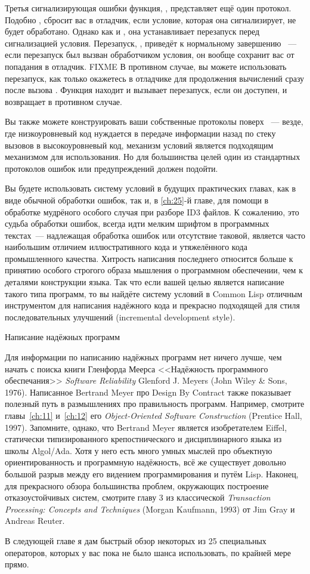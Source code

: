 Третья сигнализирующая ошибки функция, , представляет ещё один протокол.
Подобно ,  сбросит вас в отладчик, если условие, которая она
сигнализирует, не будет обработано. Однако как и , она устанавливает перезапуск
перед сигнализацией условия. Перезапуск, , приведёт к нормальному
завершению ~--- если перезапуск был вызван обработчиком условия, он вообще
сохранит вас от попадания в отладчик. FIXME В противном случае, вы можете использовать
перезапуск, как только окажетесь в отладчике для продолжения вычислений сразу после вызова
. Функция  находит и вызывает  перезапуск, если
он доступен, и возвращает  в противном случае.

Вы также можете конструировать ваши собственные протоколы поверх ~--- везде,
где низкоуровневый код нуждается в передаче информации назад по стеку вызовов в
высокоуровневый код, механизм условий является подходящим механизмом для использования. Но
для большинства целей один из стандартных протоколов ошибок или предупреждений должен
подойти.

Вы будете использовать систему условий в будущих практических главах, как в виде обычной
обработки ошибок, так и, в \ref{ch:25}-й главе, для помощи в обработке мудрёного особого случая при
разборе ID3 файлов.  К сожалению, это судьба обработки ошибок, всегда идти мелким шрифтом
в программных текстах~--- надлежащая обработка ошибок или отсутствие таковой, является
часто наибольшим отличием иллюстративного кода и утяжелённого кода промышленного качества.
Хитрость написания последнего относится больше к принятию особого строгого образа мышления
о программном обеспечении, чем к деталями конструкции языка. Так что если вашей целью
является написание такого типа программ, то вы найдёте систему условий в Common Lisp
отличным инструментом для написания надёжного кода и прекрасно подходящей для стиля
последовательных улучшений (incremental development style).


Написание надёжных программ 

Для информации по написанию надёжных программ нет ничего лучше, чем начать с поиска книги
Гленфорда Меерса <<Надёжность программного обеспечания>> \textit{Software Reliability}
Glenford J. Meyers (John Wiley \& Sons, 1976). Написанное Bertrand Meyer про Design By
Contract также показывает полезный путь в размышлениях про правильность
программ. Например, смотрите главы~\ref{ch:11} и~\ref{ch:12} его \textit{Object-Oriented
Software Construction} (Prentice Hall, 1997). Запомните, однако, что Bertrand Meyer
является изобретателем Eiffel, статически типизированного крепостнического и
дисциплинарного языка из школы Algol/Ada. Хотя у него есть много умных мыслей про
объектную ориентированность и программную надёжность, всё же существует довольно большой
разрыв между его видением программирования и путём Lisp. Наконец, для прекрасного обзора
большинства проблем, окружающих построение отказоустойчивых систем, смотрите главу 3 из
классической \textit{Transaction Processing: Concepts and Techniques} (Morgan Kaufmann,
1993) от Jim Gray и Andreas Reuter.


В следующей главе я дам быстрый обзор некоторых из 25 специальных операторов, которых у
вас пока не было шанса использовать, по крайней мере прямо.

